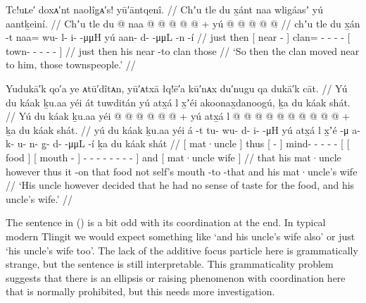 \ex\label{ex:90-88-townspeople-relocate}%
%
\begingl
	\glpreamble	Tc!uʟe′ doxᴀ′nt naołîg̣ᴀ′s! yū′āntqenî. //
	\glpreamble	Chʼu tle du x̱ánt naa wligáasʼ yú aantḵeiní. //
	\gla	Chʼu tle
		{} du  @ {} {}
		naa @  @ {} @ {} @ {} @ {} +
		{} yú  @ {} @ {} @ {} @ {} @ {} {} //
	\glb	chʼu tle
		{} du x̱án -t {}
		naa= wu- l- i-  -μμH
		{} yú aan- d-  -μμL -n -í {} //
	\glc	just then
		{}[  near - {}]
		clan= - - -  -
		{}[  town- -  - - - {}] //
	\gld	just then
		{} his near -to {}
		clan  {} {} {} {}
		{} those  {} {} {} {} {} {} // 
	\glft	‘So then the clan moved near to him, those townspeople.’
		//
\endgl
\xe

\ex\label{ex:90-89-no-taste-for-food}%
%
\begingl
	\glpreamble	Yudukā′k qo′a ye ᴀtū′dîtᴀn, yū′ᴀtxā łq!ē′a kū′nᴀx du′nugu qa dukā′k cāt. //
	\glpreamble	Yú du káak ḵu.aa yéi át tuwditán yú atx̱á l x̱ʼéi akoonax̱danoogú, ḵa du káak shát. //
	\gla	{} Yú du káak {}
		ḵu.aa
		yéi {}  @ {} {}
		 @ {} @ {} @ {} @ {} @ {} +
		{} {} yú atx̱á {} 
			l {} {}  @ {} {}
			 @ {} @ {} @ {} @ {} @ {} @ {} @ {} @ {} @ {} +
		ḵa {} du káak shát. {} //
	\glb	{} yú du káak {}
		ḵu.aa
		yéi {} á -t {}
		tu- wu- d- i-  -μH
		{} {} yú atx̱á {}
			l {} {} x̱ʼé -μ {}
			a- k- u- n- g̱- d-  -μμL -í {}
		ḵa {} du káak shát {} //
	\glc	{}[   mat·uncle {}]
		thus {}[  - {}]
		mind- - - -  -
		{}[ {}[  food {}]
			 {}[  mouth - {}]
			- - - - - -  - - {}]
		and {}[  mat·uncle wife {}] //
	\gld	{} that his mat·uncle {}
		however
		thus {} it -on {}
		 {} {} {} {} {}
		{} {} that food {}
			not {} self’s mouth -to {}
			 {} {} {} {} {} {} {} -that {}
		and {} his mat·uncle’s wife {} //
	\glft	‘His uncle however decided that he had no sense of taste for the food, and his uncle’s wife.’
		//
\endgl
\xe

The sentence in (\lastx) is a bit odd with its coordination at the end.
In typical  modern Tlingit we would expect something like  ‘and his uncle’s wife also’ or just  ‘his uncle’s wife too’.
The lack of the additive focus particle  here is grammatically strange, but the sentence is still interpretable.
This grammaticality problem suggests that there is an ellipsis or raising phenomenon with coordination here that is normally prohibited, but this needs more investigation.

